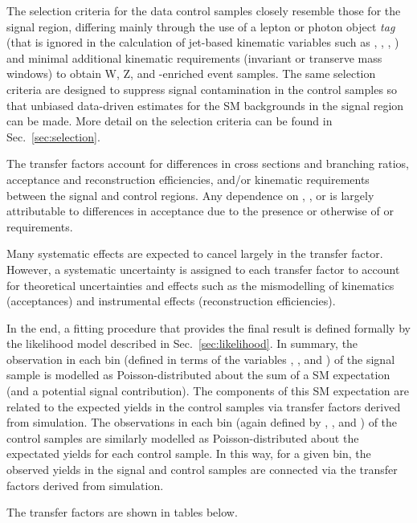 The selection criteria for the data control samples closely resemble
those for the signal region, differing mainly through the use of a
lepton or photon object {\it tag} (that is ignored in the calculation
of jet-based kinematic variables such as \scalht, \mht, \alphat, \etc)
and minimal additional kinematic requirements (\eg invariant or
transerve mass windows) to obtain W, Z, and \ttbar-enriched event
samples. The same selection criteria are designed to suppress signal
contamination in the control samples so that unbiased data-driven
estimates for the SM backgrounds in the signal region can be
made. More detail on the selection criteria can be found in Sec.~\ref{sec:selection}.

The transfer factors account for differences in cross sections and
branching ratios, acceptance and reconstruction efficiencies, and/or
kinematic requirements between the signal and control regions. Any
dependence on \njet, \nb, or \HT is largely attributable to
differences in acceptance due to the presence or otherwise of \alphat
or \mht requirements.

Many systematic effects are expected to cancel largely in the transfer
factor. However, a systematic uncertainty is assigned to each transfer
factor to account for theoretical uncertainties and effects such as
the mismodelling of kinematics (\eg acceptances) and instrumental
effects (\eg reconstruction efficiencies).

In the end, a fitting procedure that provides the final result is
defined formally by the likelihood model described in
Sec.~\ref{sec:likelihood}. In summary, the observation in each bin
(defined in terms of the variables \njet, \nb, and \scalht) of the
signal sample is modelled as Poisson-distributed about the sum of a SM
expectation (and a potential signal contribution). The components of
this SM expectation are related to the expected yields in the control
samples via transfer factors derived from simulation. The observations
in each bin (again defined by \njet, \nb, and \scalht) of the control
samples are similarly modelled as Poisson-distributed about the
expectated yields for each control sample. In this way, for a given
bin, the observed yields in the signal and control samples are
connected via the transfer factors derived from simulation. 



The transfer factors are shown in tables below.


